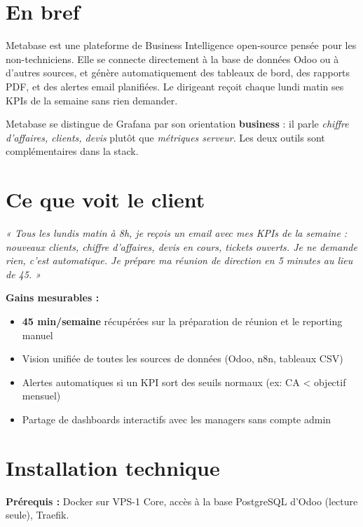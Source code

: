 \documentclass[11pt, a4paper]{article}
\begin{document}
\ficheHeader

\section*{En bref}
Metabase est une plateforme de Business Intelligence open-source pensée pour les non-techniciens. Elle se connecte directement à la base de données Odoo ou à d'autres sources, et génère automatiquement des tableaux de bord, des rapports PDF, et des alertes email planifiées. Le dirigeant reçoit chaque lundi matin ses KPIs de la semaine sans rien demander.

\begin{pointcle}
  Metabase se distingue de Grafana par son orientation \textbf{business} : il parle \textit{chiffre d'affaires, clients, devis} plutôt que \textit{métriques serveur}. Les deux outils sont complémentaires dans la stack.
\end{pointcle}

\section{Ce que voit le client}

\begin{clientbox}
  \textit{« Tous les lundis matin à 8h, je reçois un email avec mes KPIs de la semaine : nouveaux clients, chiffre d'affaires, devis en cours, tickets ouverts. Je ne demande rien, c'est automatique. Je prépare ma réunion de direction en 5 minutes au lieu de 45. »}
\end{clientbox}

\textbf{Gains mesurables :}
\begin{itemize}
  \item \textbf{45 min/semaine} récupérées sur la préparation de réunion et le reporting manuel
  \item Vision unifiée de toutes les sources de données (Odoo, n8n, tableaux CSV)
  \item Alertes automatiques si un KPI sort des seuils normaux (ex: CA < objectif mensuel)
  \item Partage de dashboards interactifs avec les managers sans compte admin
\end{itemize}

\section{Installation technique}

\textbf{Prérequis :} Docker sur VPS-1 Core, accès à la base PostgreSQL d'Odoo (lecture seule), Traefik.
\end{document}
